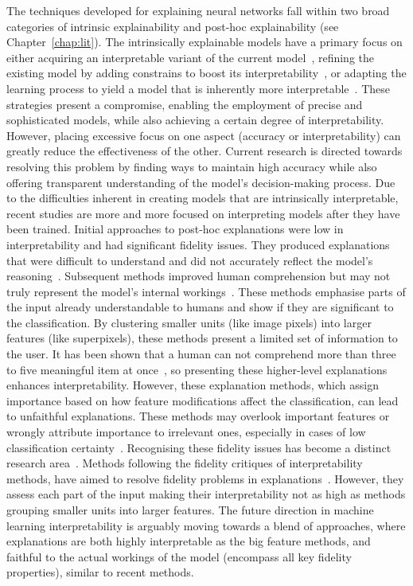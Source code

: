 The techniques developed for explaining neural networks fall within two broad categories of intrinsic explainability and post-hoc explainability (see Chapter~\ref{chap:lit}). The intrinsically explainable models have a primary focus on either acquiring an interpretable variant of the current model~\cite{VandewieleJOTH16, BastaniKB17a}, refining the existing model by adding constrains to boost its interpretability~\cite{ZhangWZ18a, NguyenYC16, SabourFH17}, or adapting the learning process to yield a model that is inherently more interpretable~\cite{LinsleySES19, ShiXXCLLG21}. These strategies present a compromise, enabling the employment of precise and sophisticated models, while also achieving a certain degree of interpretability. However, placing excessive focus on one aspect (\ie accuracy or interpretability) can greatly reduce the effectiveness of the other. Current research is directed towards resolving this problem by finding ways to maintain high accuracy while also offering transparent understanding of the model's decision-making process. Due to the difficulties inherent in creating models that are intrinsically interpretable, recent studies are more and more focused on interpreting models after they have been trained. Initial approaches to post-hoc explanations were low in interpretability and had significant fidelity issues. They produced explanations that were difficult to understand and did not accurately reflect the model's reasoning~\cite{SimonyanVZ13, SpringenbergDBR14}. Subsequent methods improved human comprehension but may not truly represent the model's internal workings~\cite{Ribeiro0G16, LundbergL17, ElenbergDFK17, Ribeiro0G18}. These methods emphasise parts of the input already understandable to humans and show if they are significant to the classification. By clustering smaller units (like image pixels) into larger features (like superpixels), these methods present a limited set of information to the user. It has been shown that a human can not comprehend more than three to five meaningful item at once~\cite{cowan2001magical, starkey1995development, morris2018human}, so presenting these higher-level explanations enhances interpretability. However, these explanation methods, which assign importance based on how feature modifications affect the classification, can lead to unfaithful explanations. These methods may overlook important features or wrongly attribute importance to irrelevant ones, especially in cases of low classification certainty~\cite{Kottke}. Recognising these fidelity issues has become a distinct research area~\cite{KindermansHAASDEK19, DombrowskiAAAMK19, GhorbaniAZ19}. Methods following the fidelity critiques of interpretability methods, have aimed to resolve fidelity problems in explanations~\cite{ShrikumarGK17, SundararajanTY17, SmilkovTKVW17, ChattopadhyaySH18, bach2015pixel}. However, they assess each part of the input making their interpretability not as high as methods grouping smaller units into larger features. The future direction in machine learning interpretability is arguably moving towards a blend of approaches, where explanations are both highly interpretable as the big feature methods, and faithful to the actual workings of the model (\ie encompass all key fidelity properties), similar to recent methods.


